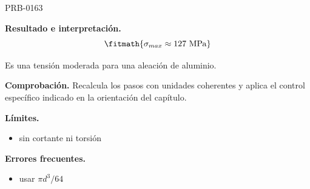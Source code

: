 \begin{studiumworked}{PRB-0163}
\begin{enumerate}
\end{enumerate}

\textbf{Resultado e interpretación.}\[\fitmath{\sigma_{max} \approx 127\ \mathrm{MPa}}\]

Es una tensión moderada para una aleación de aluminio.

\par\textbf{Comprobación.} Recalcula los pasos con unidades coherentes y aplica el control específico indicado en la orientación del capítulo.

\textbf{Límites.}\begin{itemize}\item sin cortante ni torsión\end{itemize}

\textbf{Errores frecuentes.}\begin{itemize}\item usar $\pi d^3/64$\end{itemize}

\end{studiumworked}

\Needspace{.3\textheight}


